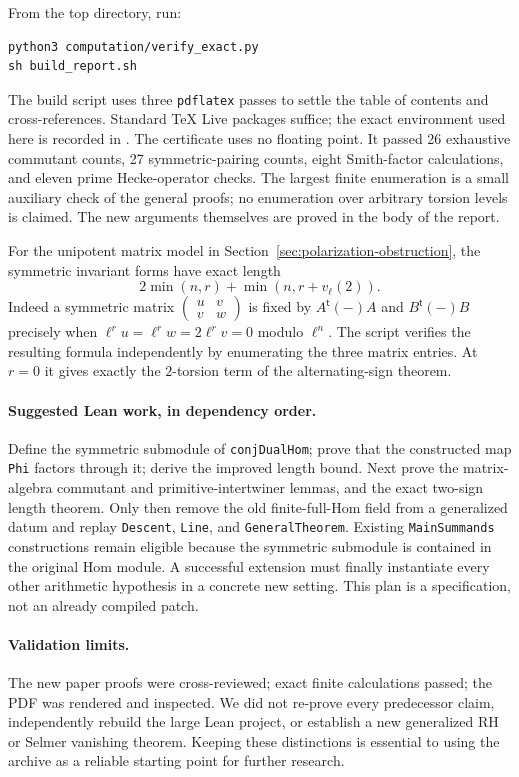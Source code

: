From the top directory, run:
\begin{verbatim}
python3 computation/verify_exact.py
sh build_report.sh
\end{verbatim}
The build script uses three \texttt{pdflatex} passes to settle the table of
contents and cross-references. Standard \TeX{} Live packages suffice; the
exact environment used here is recorded in
.
The certificate uses no floating point. It passed 26 exhaustive commutant
counts, 27 symmetric-pairing counts, eight Smith-factor calculations, and
eleven prime Hecke-operator checks. The largest finite enumeration is a
small auxiliary check of the general proofs; no enumeration over arbitrary
torsion levels is claimed. The new arguments themselves are proved in the
body of the report.

For the unipotent matrix model in Section~\ref{sec:polarization-obstruction},
the symmetric invariant forms have exact length
\[
 2\min(n,r)+\min(n,r+v_\ell(2)).
\]
Indeed a symmetric matrix
$\left(\begin{smallmatrix}u&v\\v&w\end{smallmatrix}\right)$ is fixed by
$A^{\mathsf t}(-)A$ and $B^{\mathsf t}(-)B$ precisely when
$\ell^r u=\ell^r w=2\ell^r v=0$ modulo $\ell^n$.
The script verifies the resulting formula independently by enumerating the
three matrix entries. At $r=0$ it gives exactly the $2$-torsion term of
the alternating-sign theorem.

\clearpage
\paragraph{Suggested Lean work, in dependency order.}
Define the symmetric submodule of \texttt{conjDualHom}; prove that the
constructed map \texttt{Phi} factors through it; derive the improved length
bound. Next prove the matrix-algebra commutant and primitive-intertwiner
lemmas, and the exact two-sign length theorem. Only then remove the old
finite-full-Hom field from a generalized datum and replay
\texttt{Descent}, \texttt{Line}, and \texttt{GeneralTheorem}. Existing
\texttt{MainSummands} constructions remain eligible because the symmetric
submodule is contained in the original Hom module. A successful extension
must finally instantiate every other arithmetic hypothesis in a concrete
new setting. This plan is a specification, not an already compiled patch.

\paragraph{Validation limits.}
The new paper proofs were cross-reviewed; exact finite calculations passed;
the PDF was rendered and inspected. We did not re-prove every predecessor
claim, independently rebuild the large Lean project, or establish a new
generalized RH or Selmer vanishing theorem. Keeping these distinctions is
essential to using the archive as a reliable starting point for further
research.
